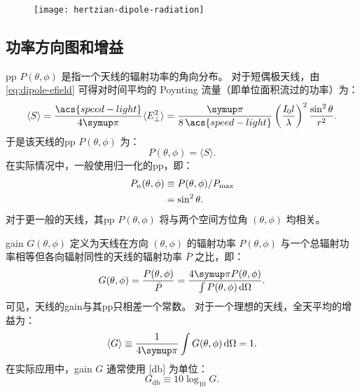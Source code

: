 \begin{figure}[htp]
  \centering
  \texttt{[image: hertzian-dipole-radiation]}
  \label{fig:dipole-radiation}
\end{figure}

\subsection{功率方向图和增益}

\acf{pp} $P(\theta,\phi)$ 是指一个天线的辐射功率的角向分布。
对于短偶极天线，由\autoref{eq:dipole-efield} 可得对时间平均的
Poynting 流量（即单位面积流过的功率）为：
\begin{equation}
  \label{eq:poynting-flux}
  \langle S \rangle
    = \frac{\acs{speed-light}}{4\Cpi} \langle E_{\perp}^2 \rangle
    = \frac{\Cpi}{8\,\acs{speed-light}}
      \left( \frac{I_0 l}{\lambda} \right)^2 \frac{\sin^2\theta}{r^2} .
\end{equation}
于是该天线的\ac{pp} $P(\theta,\phi)$ 为：
\begin{equation}
  P(\theta,\phi) = \langle S \rangle.
\end{equation}
在实际情况中，一般使用归一化的\ac{pp}，即：
\begin{align}
  \label{eq:power-pattern}
  P_n(\theta,\phi)
    & \equiv P(\theta,\phi) / P_{\mathrm{max}} \\
    & = \sin^2\theta .
\end{align}
对于更一般的天线，其\ac{pp} $P(\theta,\phi)$
将与两个空间方位角 $(\theta, \phi)$ 均相关。

\acf{gain} $G(\theta,\phi)$ 定义为天线在方向 $(\theta, \phi)$
的辐射功率 $P(\theta,\phi)$ 与一个总辐射功率相等但各向辐射同性的天线的辐射功率
$\bar{P}$ 之比，即：
\begin{equation}
  \label{eq:gain}
  G(\theta,\phi) = \frac{P(\theta,\phi)}{\bar{P}}
    = \frac{4\Cpi P(\theta,\phi)}{\int P(\theta,\phi) \,\D{\Omega}} .
\end{equation}
可见，天线的\ac{gain}与其\ac{pp}只相差一个常数。
对于一个理想的天线，全天平均的增益为：
\begin{equation}
  \label{eq:gain-avg}
  \langle G \rangle
    \equiv \frac{1}{4\Cpi} \int G(\theta,\phi) \,\D{\Omega}
    = 1 .
\end{equation}
在实际应用中，\ac{gain} $G$ 通常使用 [\si{\decibel}] 为单位：
\begin{equation}
    G_{\si{\decibel}} \equiv 10 \log_{10} G .
\end{equation}

